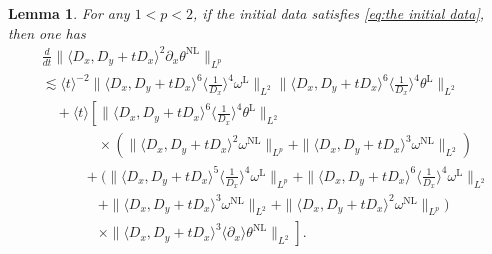 \documentclass[reqno, 12pt]{amsart} %
\theoremstyle{plain} %
\newtheorem{Lem}[Thm]{Lemma}     %
\theoremstyle{definition}
\theoremstyle{remark}
\numberwithin{equation}{section} %
\newcommand{\lt}{\left}
\newcommand{\rt}{\right}
\newcommand{\px}{\partial_x}
\begin{document}
	\begin{Lem} \label{lem:temp3}
		For any $1<p<2$, if the initial data satisfies \eqref{eq:the initial data}, then one has
		$$
		\begin{aligned}
			& \frac{d}{d t}\|\langle D_x, D_y + t D_x\rangle^2 \px \theta^{\mathrm{NL}}\|_{L^p}  \\ &\lesssim \langle t\rangle^{-2} \|\langle D_x, D_y+t D_x\rangle^6\langle\frac{1}{D_x}\rangle^4 \omega^{\mathrm{L}}\|_{L^2}                 \|\langle D_x, D_y+t D_x\rangle^6\langle\frac{1}{D_x}\rangle^4 \theta^{\mathrm{L}}\|_{L^2} \\
			&\quad +\langle t \rangle\left[  \|\langle D_x, D_y+t D_x\rangle^6\langle\frac{1}{D_x}\rangle^4 \theta^{\mathrm{L}}\|_{L^2} \rt.\\
			&\lt. \qquad \qquad  \times \left(\|\langle D_x, D_y+t D_x\rangle^2 \omega^{\mathrm{NL}}\|_{L^p}  + \|\langle D_x, D_y+t D_x\rangle^3 \omega^{\mathrm{NL}}\|_{L^2} \right)  \rt.\\
			&\lt.\quad\quad \quad  + (   \|\langle D_x, D_y+t D_x\rangle^5 \langle\frac{1}{D_x}\rangle^4 \omega^{\mathrm{L}}\|_{L^p} +  \|\langle D_x, D_y+t D_x\rangle^6\langle\frac{1}{D_x}\rangle^4 \omega^{\mathrm{L}}\|_{L^2} \rt. \\
			&\lt. \quad\quad \qquad + \|\langle D_x, D_y+t D_x\rangle^3 \omega^{\mathrm{NL}}\|_{L^2} + \|\langle D_x, D_y+t D_x\rangle^2 \omega^{\mathrm{NL}}\|_{L^p}  ) \rt.\\
			&\lt. \qquad \qquad \times \|\langle D_x, D_y+t D_x\rangle^3 \langle\px\rangle \theta^{\mathrm{NL}}\|_{L^2}  \rt] .
		\end{aligned}
		$$
	\end{Lem}
\end{document}

